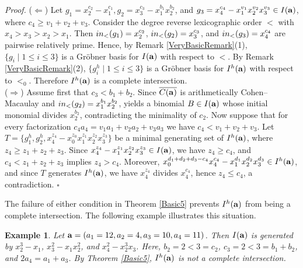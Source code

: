 \documentclass[10pt,a4paper]{amsart}
\newtheorem{ex1}[thm1]{Example}
\begin{document}
{\em \noindent Proof.} ($\Leftarrow$) Let $g_{1}=x_{2}^{c_2}-x_{1}^{c_1}, g_{2}=x_{3}^{c_3}-x_{1}^{b_1}x_{2}^{b_2}$, and $g_{3}=x_{4}^{c_4}-x_{1}^{v_1}x_{2}^{v_2}x_{3}^{v_3} \in I({\bf a})$, where $c_{4} \geq v_1+v_{2}+v_{3}$. Consider the degree reverse lexicographic order $<$ with $x_{4}>x_{3}>x_{2}>x_{1}$. Then ${\rm in}_{<}(g_1)=x_{2}^{c_2}$, ${\rm in}_{<}(g_2)=x_{3}^{c_3}$, and ${\rm in}_{<}(g_{3})=x_{4}^{c_4}$ are pairwise relatively prime. Hence, by Remark \ref{VeryBasicRemark}(1), $\{g_{i} \mid 1 \leq i \leq 3\}$ is a Gr\"obner basis for $I({\bf a})$ with respect to $<$. By Remark \ref{VeryBasicRemark}(2), $\{g_{i}^{h} \mid 1 \leq i \leq 3\}$ is a Gr\"obner basis for $I^{h}({\bf a})$ with respect to $<_{0}$. Therefore $I^{h}({\bf a})$ is a complete intersection.\\
($\Rightarrow$) Assume first that $c_3<b_1+b_2$. Since $\overline{C({\bf a})}$ is arithmetically Cohen--Macaulay and ${\rm in}_{<}(g_2)=x_1^{b_1}x_2^{b_2}$, \cite[Theorem~2.2]{HerSta} yields a binomial $B\in I({\bf a})$
whose initial monomial divides $x_2^{b_2}$, contradicting
the minimality of $c_2$. Now suppose that for every factorization $c_{4}a_{4}=v_{1}a_{1}+v_{2}a_{2}+v_{3}a_{3}$ we have $c_{4}<v_1+v_{2}+v_{3}$. Let $T=\{g_{1}^{h}, g_{2}^{h}, x_{4}^{z_4}-x_{0}^{z_{0}}x_{1}^{z_1}x_{2}^{z_2}x_{3}^{z_3}\}$ be a minimal generating set of $I^{h}({\bf a})$, where $z_{4} \geq z_{1}+z_{2}+z_{3}$. Since $x_{4}^{z_4}-x_{1}^{z_1}x_{2}^{z_2}x_{3}^{z_3} \in I({\bf a})$, we have $z_{4} \geq c_4$, and $c_4<z_1+z_2+z_3$ implies $z_4>c_4$. Moreover, $x_{0}^{d_1+d_2+d_3-c_4}x_{4}^{c_4}-x_{1}^{d_1}x_2^{d_2}x_{3}^{d_3} \in I^{h}({\bf a})$, and since $T$ generates $I^{h}({\bf a})$, we have $x_{4}^{z_4}$ divides $x_{4}^{c_4}$, hence $z_{4} \leq c_4$, a contradiction. \hfill $\square$ \par\vspace{0.5\baselineskip}

The failure of either condition in Theorem \ref{Basic5} prevents $I^{h}({\bf a})$ from being a complete intersection. The following example illustrates this situation.

\begin{ex1} {\rm Let ${\bf a}=(a_1=12, a_2=4, a_3=10, a_4=11)$. Then $I({\bf a})$ is generated by $x_{2}^{3}-x_1$, $x_{3}^{2}-x_{1}x_{2}^{2}$, and $x_{4}^{2}-x_{2}^{3}x_{3}$. Here, $b_{2}=2<3=c_{2}$, $c_{3}=2<3=b_{1}+b_{2}$, and $2a_4=a_1+a_3$. By Theorem \ref{Basic5}, $I^{h}({\bf a})$ is not a complete intersection.}
\end{ex1}
\end{document}
